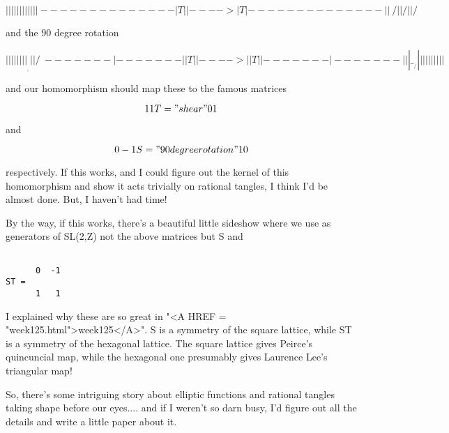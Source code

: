 $$

  |   |                |   |
  |   |                |   |
  |   |                |   |
 -------              -------
 |  T  |   |---->     |  T  |        
 -------              -------
  |   |                 \ /
  |   |                  / 
  |   |                 / \
$$
    
and the 90 degree rotation


$$

  |   |             |     |     
  |   |             |     |    ____
  |   |             |     |   /    \
 -------            |    -------    |
 |  T  |   |---->   |    |  T  |    |    
 -------            |    -------    |
  |   |              \___/   |      |
  |   |                      |      |
  |   |                      |      |
   
$$
    
and our homomorphism should map these to the famous matrices


$$

      1   1             
T  =                    "shear"
      0   1
$$
    
and 


$$

      0  -1          
S =                   "90 degree rotation"
      1   0
$$
    
respectively.   If this works, and I could figure out the kernel of 
this homomorphism and show it acts trivially on rational tangles, 
I think I'd be almost done.  But, I haven't had time!

By the way, if this works, there's a beautiful little sideshow where 
we use as generators of SL(2,Z) not the above matrices but S and 


\begin{verbatim}

      0  -1
ST = 
      1   1
\end{verbatim}
    

I explained why these are so great in "<A HREF = "week125.html">week125</A>".  S is a symmetry of
the square lattice, while ST is a symmetry of the hexagonal lattice.
The square lattice gives Peirce's quincuncial map, while the hexagonal
one presumably gives Laurence Lee's triangular map!

So, there's some intriguing story about elliptic functions and rational
tangles taking shape before our eyes.... and if I weren't so darn busy,
I'd figure out all the details and write a little paper about it. 

